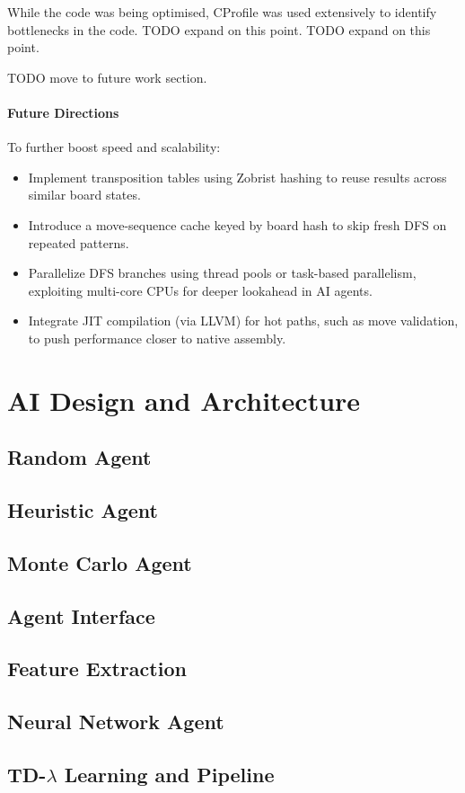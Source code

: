While the code was being optimised, CProfile was used extensively to identify bottlenecks in the code. TODO expand on this point. TODO expand on this point.

TODO move to future work section.
\paragraph{Future Directions}
To further boost speed and scalability:
\begin{itemize}
\item Implement transposition tables using Zobrist hashing to reuse results across similar board states.
\item Introduce a move-sequence cache keyed by board hash to skip fresh DFS on repeated patterns.
\item Parallelize DFS branches using thread pools or task-based parallelism, exploiting multi-core CPUs for deeper lookahead in AI agents.
\item Integrate JIT compilation (via LLVM) for hot paths, such as move validation, to push performance closer to native assembly.
\end{itemize}


\section{AI Design and Architecture}
\subsection{Random Agent}
\subsection{Heuristic Agent}
\subsection{Monte Carlo Agent}
\subsection{Agent Interface}
\subsection{Feature Extraction}
\subsection{Neural Network Agent}
\subsection{TD-$\lambda$ Learning and Pipeline}



